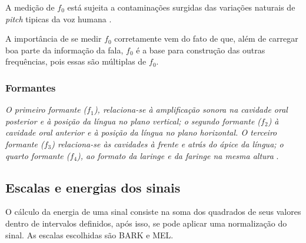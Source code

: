 				\par A medição de $f_0$ está sujeita a contaminações surgidas das variações naturais de \textit{pitch} tipicas da voz humana \cite{freitas2013avaliaccao}.
				
				\par A importância de se medir $f_0$ corretamente vem do fato de que, além de carregar boa parte da informação da fala, $f_0$ é a base para construção das outras frequências, pois essas são múltiplas de $f_0$.
				
				\subsubsection{Formantes}
				
				\par \textit{O primeiro formante ($f_1$), relaciona-se à  amplificação  sonora  na  cavidade  oral  posterior  e  à  posição  da  língua  no  plano  vertical;  o segundo  formante  ($f_2$)  à  cavidade  oral  anterior  e  à  posição  da  língua  no  plano  horizontal.  O terceiro  formante  ($f_3$)  relaciona-se  às  cavidades  à  frente  e  atrás  do  ápice  da  língua;  o  quarto formante  ($f_4$),  ao  formato  da  laringe  e  da  faringe  na  mesma  altura} \cite{valencca2014analise}.

\subsection{Escalas e energias dos sinais}
	\par O cálculo da energia de uma sinal consiste na soma dos quadrados de seus valores dentro de intervalos definidos, após  isso, se pode aplicar uma normalização do sinal. As escalas escolhidas são BARK e MEL.
